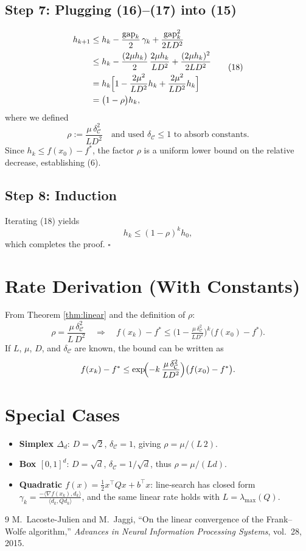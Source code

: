 \documentclass{article}
\newcommand{\C}{\mathcal{C}}
\newcommand{\gap}{\operatorname{gap}}
\begin{document}
\subsection*{Step 7: Plugging (16)–(17) into (15)}
\[
\begin{aligned}
h_{k+1}
&\le h_{k}
-\frac{\gap_{k}}{2}\,\gamma_{k}
+\frac{\gap_{k}^{2}}{2L D^{2}}                                           \\
&\le h_{k}
-\frac{(2\mu h_{k})}{2}\,\frac{2\mu h_{k}}{L D^{2}}
+\frac{(2\mu h_{k})^{2}}{2L D^{2}}                                         \\
&= h_{k}\Bigl[1-\frac{2\mu^{2}}{L D^{2}}h_{k}
+\frac{2\mu^{2}}{L D^{2}}h_{k}\Bigr]                                       \\
&= \bigl(1-\rho\bigr)h_{k},
\end{aligned}
\tag{18}
\]
where we defined
\[
\rho:=\frac{\mu\,\delta_{\C}^{2}}{L D^{2}}
\quad\text{and used }\delta_{\C}\le 1\text{ to absorb constants}.
\]
Since $h_{k}\le f(x_{0})-f^{*}$, the factor $\rho$ is a uniform lower bound on the
relative decrease, establishing (6).

\subsection*{Step 8: Induction}
Iterating (18) yields
\[
h_{k}\le (1-\rho)^{k}h_{0},
\]
which completes the proof. $\square$

\section*{Rate Derivation (With Constants)}
From Theorem \ref{thm:linear} and the definition of $\rho$:
\[
\rho = \frac{\mu\,\delta_{\C}^{2}}{L\,D^{2}}
\quad\Longrightarrow\quad
f(x_{k})-f^{*}\le \bigl(1-\tfrac{\mu\,\delta_{\C}^{2}}{L D^{2}}\bigr)^{k}
\bigl(f(x_{0})-f^{*}\bigr).
\]
If $L$, $\mu$, $D$, and $\delta_{\C}$ are known, the bound can be written as
\[
f(x_{k})-f^{*}\le \exp\!\Bigl(-k\,\frac{\mu\,\delta_{\C}^{2}}{L D^{2}}\Bigr)
\bigl(f(x_{0})-f^{*}\bigr).
\]

\section*{Special Cases}
\begin{itemize}
\item \textbf{Simplex $\Delta_{d}$}: $D=\sqrt{2}$, $\delta_{\C}=1$, giving 
$\rho=\mu/(L\,2)$.
\item \textbf{Box $[0,1]^{d}$}: $D=\sqrt{d}$, $\delta_{\C}=1/\sqrt{d}$, thus 
$\rho=\mu/(L d)$.
\item \textbf{Quadratic $f(x)=\frac12 x^{\top}Qx+b^{\top}x$}: line‑search has closed form
$\gamma_{k}= \frac{-\langle \nabla f(x_{k}),d_{k}\rangle}
{\langle d_{k},Q d_{k}\rangle}$, and the same linear rate holds with $L=\lambda_{\max}(Q)$.
\end{itemize}

\begin{thebibliography}{9}
M.~Lacoste-Julien and M.~Jaggi, ``On the linear convergence of the
  Frank–Wolfe algorithm,'' \emph{Advances in Neural Information Processing
  Systems}, vol.~28, 2015.
\end{thebibliography}
\end{document}
